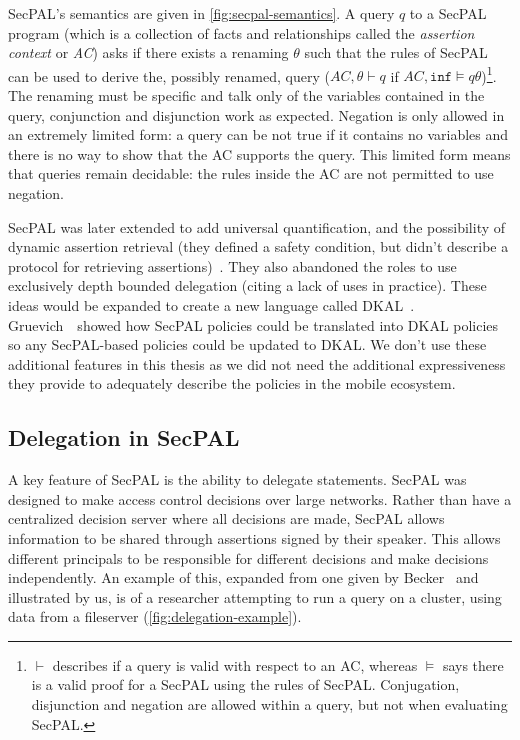 \documentclass[thesis.tex]{subfiles}
\begin{document}
SecPAL's semantics are given in \autoref{fig:secpal-semantics}.  A
query $q$ to a SecPAL program (which is a collection of facts and
relationships called the \emph{assertion context} or \emph{AC}) asks
if there exists a renaming $\theta$ such that the rules of SecPAL can
be used to derive the, possibly renamed, query ($AC,\theta \vdash q$
if $AC,\texttt{inf} \models q\theta$)\footnote{$\vdash$ describes if a query
  is valid with respect to an AC, whereas $\models$ says there is a
  valid proof for a SecPAL using the rules of SecPAL.  Conjugation,
  disjunction and negation are allowed within a query, but not when
  evaluating SecPAL.}.  The renaming must be specific and talk only of
the variables contained in the query, conjunction and disjunction work
as expected.  Negation is only allowed in an extremely limited form: a
query can be not true if it contains no variables and there is no way
to show that the AC supports the query.  This limited form means that
queries remain decidable: the rules inside the AC are not permitted to
use negation.

SecPAL was later extended to add universal quantification, and the possibility
of dynamic assertion retrieval (they defined a safety condition, but didn't
describe a protocol for retrieving
assertions)~\cite{moritz_y_becker_secpal:_2009}. They also abandoned the roles
to use exclusively depth bounded delegation (citing a lack of uses in practice).
These ideas would be expanded to create a new language called
DKAL~\cite{gurevich_dkal:_2008}. Gruevich~\etal~showed how SecPAL policies could
be translated into DKAL policies~\cite{gurevich_dkal:_2008} so any SecPAL-based
policies could be updated to DKAL. We don't use these additional features in
this thesis as we did not need the additional expressiveness they provide to
adequately describe the policies in the mobile ecosystem.

\subsection{Delegation in SecPAL}

A key feature of SecPAL is the ability to delegate statements. SecPAL was
designed to make access control decisions over large networks. Rather than have
a centralized decision server where all decisions are made, SecPAL allows
information to be shared through assertions signed by their speaker. This allows
different principals to be responsible for different decisions and make
decisions independently. An example of this, expanded from one given by
Becker~\cite{becker_secpal:_2006} and illustrated by us, is of a
researcher attempting to run a query on a cluster, using data from a fileserver
(\autoref{fig:delegation-example}).
\end{document}
